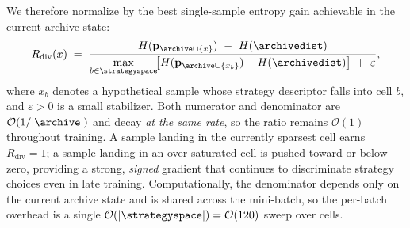 We therefore normalize by the best single-sample entropy gain achievable in the current archive state:
\begin{equation}
  R_{\mathrm{div}}(x) \;=\;
  \frac{\,H(\mathbf{p}_{\archive\cup\{x\}})\ -\ H(\archivedist)\,}
       {\displaystyle\max_{b\in\strategyspace}\!\bigl[H(\mathbf{p}_{\archive\cup\{x_b\}})-H(\archivedist)\bigr]\;+\;\varepsilon},
  \label{eq:coverage-gain}
\end{equation}
where $x_b$ denotes a hypothetical sample whose strategy descriptor falls into cell $b$, and $\varepsilon>0$ is a small stabilizer. Both numerator and denominator are $\mathcal{O}(1/|\archive|)$ and decay \emph{at the same rate}, so the ratio remains $\mathcal{O}(1)$ throughout training. A sample landing in the currently sparsest cell earns $R_{\mathrm{div}}=1$; a sample landing in an over-saturated cell is pushed toward or below zero, providing a strong, \emph{signed} gradient that continues to discriminate strategy choices even in late training. Computationally, the denominator depends only on the current archive state and is shared across the mini-batch, so the per-batch overhead is a single $\mathcal{O}(|\strategyspace|)=\mathcal{O}(120)$ sweep over cells.

